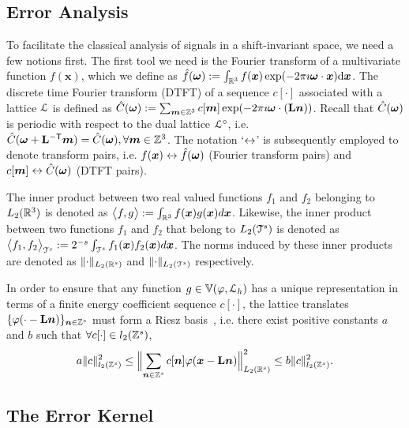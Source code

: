 \subsection{Error Analysis} \label{sec:sis_error}
To facilitate the classical analysis of signals in a shift-invariant space, we need a few notions first. The first tool we need is the Fourier transform of a multivariate function $f(\mathbf{x})$, which we define as $\hat{f}(\boldsymbol{\omega}) := \int_{\mathbb{R}^3} f(\boldsymbol{x}) \exp(-2\pi \imath
\boldsymbol{\omega} \cdot \boldsymbol{x})  \mathrm{d}\boldsymbol{x} $. The discrete time Fourier transform (DTFT) of a sequence $c[\cdot]$ associated with a lattice $\mathcal{L}$ is defined as $\hat{C}(\boldsymbol{\omega}) := \sum_{\boldsymbol{m}  \in \mathbb{Z}^3} c[\boldsymbol{m}] \exp(-2 \pi \imath \boldsymbol{\omega} \cdot
(\mathbf{L}\boldsymbol{n}))$. Recall that $\hat{C}(\boldsymbol{\omega})$ is periodic with respect to the dual lattice $\mathcal{L}^{\circ}$, i.e. $\hat{C}(\boldsymbol{\omega} + {\mathbf{L}}^{\mathsf{-T}} \boldsymbol{m}) = \hat{C}(\boldsymbol{\omega}), \forall \boldsymbol{m} \in \mathbb{Z}^3$. The notation `$\leftrightarrow$' is subsequently employed to denote transform pairs, i.e. $f(\boldsymbol{x}) \leftrightarrow \hat{f}(\boldsymbol{\omega})$ (Fourier transform pairs) and $c[\boldsymbol{m}] \leftrightarrow \hat{C}(\boldsymbol{\omega})$ (DTFT pairs).


The inner product between two real valued functions $f_1$ and $f_2$ belonging to $L_2(\mathbb{R}^3)$ is denoted as $\bigl \langle f , g \bigr \rangle := \int_{\mathbb{R}^3} f(\boldsymbol{x}) g(\boldsymbol{x}) d\boldsymbol{x}$. Likewise, the inner product between two functions $f_1$ and $f_2$ that belong to $L_2(\mathcal{T}^s)$ is denoted as $\bigl \langle f_1 , f_2 \bigr \rangle_{\mathcal{T}^s} := {2^{-s}} \int_{\mathcal{T}^s} f_1(\boldsymbol{x}) f_2(\boldsymbol{x}) d\boldsymbol{x}$. The norms induced by these inner products are denoted as $\lVert \cdot \rVert_{L_2(\mathbb{R}^s)}$ and $\lVert \cdot \rVert_{L_2(\mathcal{T}^s)}$ respectively.


In order to ensure that any function $g \in \mathbb{V}({\varphi},{\mathcal{L}_h})$ has a unique representation in terms of a finite energy coefficient sequence $c[\cdot]$, the lattice translates $\{\varphi(\cdot - \mathbf{L}\boldsymbol{n})\}_{\boldsymbol{n}  \in \mathbb{Z}^s}$ must form a Riesz basis~\cite{kreyszig89}, i.e. there exist positive constants $a$ and $b$ such that $\forall c[\cdot] \in l_2(\mathbb{Z}^s)$,
\begin{equation*}
  a \lVert c\rVert^2_{l_2(\mathbb{Z}^s)} \le \Bigl\lVert \sum_{\boldsymbol{n} \in \mathbb{Z}^s}
  c[\boldsymbol{n}] \varphi(\boldsymbol{x} - \mathbf{L}\boldsymbol{n}) \Bigr\rVert_{L_2(\mathbb{R}^s)}^2 \le b
	\lVert c\rVert^2_{l_2(\mathbb{Z}^s)}.
\end{equation*}

\subsection{The Error Kernel}

